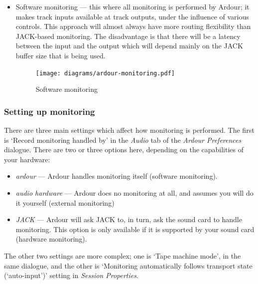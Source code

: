 \documentclass[10pt,a4paper]{book}
\begin{document}
{\begin{itemize}
\begin{figure}[ht]
\begin{center}
\texttt{[image: diagrams/jack-monitoring.pdf]}
\end{center}
\caption{JACK-based `hardware' monitoring}
\label{fig:jack-monitoring}
\end{figure}

\item Software monitoring --- this where all monitoring is performed
  by Ardour; it makes track inputs available at track outputs, under
  the influence of various controls.  This approach will almost always
  have more routing flexibility than JACK-based monitoring.  The
  disadvantage is that there will be a latency between the input and
  the output which will depend mainly on the JACK buffer size that is
  being used.

\begin{figure}[ht]
\begin{center}
\texttt{[image: diagrams/ardour-monitoring.pdf]}
\end{center}
\caption{Software monitoring}
\label{fig:ardour-monitoring}
\end{figure}

\end{itemize}

\subsubsection{Setting up monitoring}

There are three main settings which affect how monitoring is
performed.  The first is `Record monitoring handled by' in the
\emph{Audio} tab of the \emph{Ardour Preferences} dialogue.  There are
two or three options here, depending on the capabilities of your
hardware:

\begin{itemize}
\item \emph{ardour} --- Ardour handles monitoring itself (software monitoring).
\item \emph{audio hardware} --- Ardour does no monitoring at all, and
  assumes you will do it yourself (external monitoring)
\item \emph{JACK} --- Ardour will ask JACK to, in turn, ask the sound
  card to handle monitoring.  This option is only available if it is
  supported by your sound card (hardware monitoring).
\end{itemize}

The other two settings are more complex; one is `Tape machine mode',
in the same dialogue, and the other is `Monitoring automatically
follows transport state (`auto-input')' setting in \emph{Session
  Properties}.

}
\end{document}
